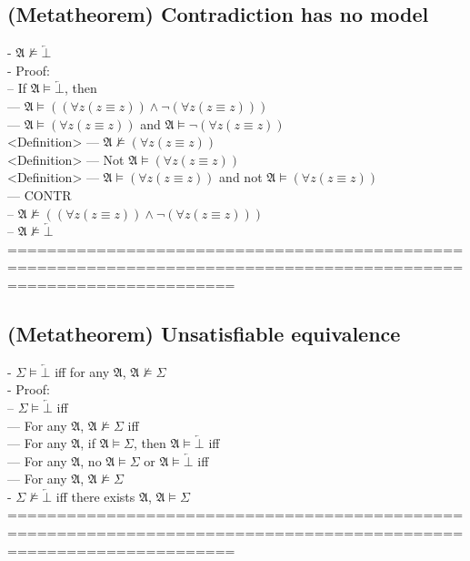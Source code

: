 \documentclass{book}
\newcommand{\inot}{\not}
\newcommand{\contr}{\overleftarrow{\bot}}
\begin{document}
\subsection{(Metatheorem) Contradiction has no model} %
	- $\mathfrak{A} \inot \vDash \contr$ \\
	- Proof: \\
		-- If $\mathfrak{A} \vDash \contr$, then \\
			--- $\mathfrak{A} \vDash ((\forall z (z \equiv z)) \land \lnot (\forall z (z \equiv z)))$ \\
			--- $\mathfrak{A} \vDash (\forall z (z \equiv z))$ and $\mathfrak{A} \vDash \lnot (\forall z (z \equiv z))$ \\ <Definition>
			--- $\mathfrak{A} \inot \vDash (\forall z (z \equiv z))$ \\ <Definition>
			--- Not $\mathfrak{A} \vDash (\forall z (z \equiv z))$ \\ <Definition>
			--- $\mathfrak{A} \vDash (\forall z (z \equiv z))$ and not $\mathfrak{A} \vDash (\forall z (z \equiv z))$ \\
			--- CONTR \\
		-- $\mathfrak{A} \inot \vDash ((\forall z (z \equiv z)) \land \lnot (\forall z (z \equiv z)))$ \\
		-- $\mathfrak{A} \inot \vDash \contr$ \\
	===================================================================================================================
\subsection{(Metatheorem) Unsatisfiable equivalence} %
	- $\Sigma \vDash \contr$ iff for any $\mathfrak{A}$, $\mathfrak{A} \inot \vDash \Sigma$ \\
	- Proof: \\
		-- $\Sigma \vDash \contr$ iff \\
			--- For any $\mathfrak{A}$, $\mathfrak{A} \inot \vDash \Sigma$ iff \\
			--- For any $\mathfrak{A}$, if $\mathfrak{A} \vDash \Sigma$, then $\mathfrak{A} \vDash \contr$ iff \\
			--- For any $\mathfrak{A}$, no $\mathfrak{A} \vDash \Sigma$ or $\mathfrak{A} \vDash \contr$ iff \\
			--- For any $\mathfrak{A}$, $\mathfrak{A} \inot \vDash \Sigma$ \\
		- $\Sigma \inot \vDash \contr$ iff there exists $\mathfrak{A}$, $\mathfrak{A} \vDash \Sigma$ \\
	===================================================================================================================
\end{document}
